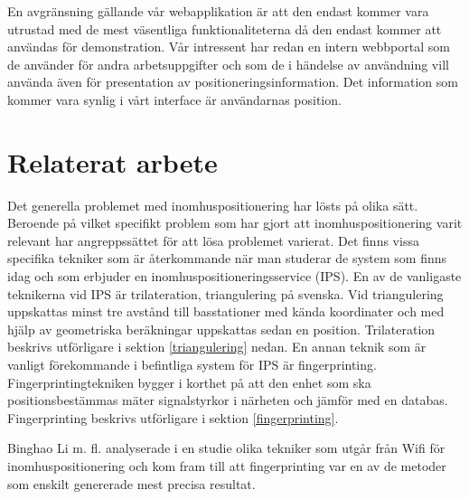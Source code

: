 \documentclass[swedish, a4paper,12pt]{article}
\begin{document}
En avgränsning gällande vår webapplikation är att den endast kommer vara utrustad med de mest väsentliga funktionaliteterna då den endast kommer att användas för demonstration. Vår intressent har redan en intern webbportal som de använder för andra arbetsuppgifter och som de i händelse av användning vill använda även för presentation av positioneringsinformation. Det information som kommer vara synlig i vårt interface är användarnas position.

\section{Relaterat arbete}
Det generella problemet med inomhuspositionering har lösts på olika sätt.
Beroende på vilket specifikt problem som har gjort att inomhuspositionering varit relevant har angreppssättet för att lösa problemet varierat. Det finns vissa specifika tekniker som är återkommande när man studerar de system som finns idag och som erbjuder en inomhuspositioneringsservice (IPS)\cite{IP1}.
En av de vanligaste teknikerna vid IPS är trilateration\cite{cook2005indoor}, triangulering på svenska. Vid triangulering uppskattas minst tre avstånd till basstationer med kända koordinater och med hjälp av geometriska beräkningar uppskattas sedan en position. Trilateration beskrivs utförligare i sektion \ref{triangulering}
 nedan. En annan teknik som är vanligt förekommande i befintliga system för IPS är fingerprinting\cite{IP1}\cite{jun2018low}. Fingerprintingtekniken bygger i korthet på att den enhet som ska positionsbestämmas mäter signalstyrkor i närheten och jämför med en databas. Fingerprinting beskrivs utförligare i sektion \ref{fingerprinting}.

Binghao Li m. fl. analyserade i en studie \cite{IP1} olika tekniker som utgår från Wifi för inomhuspositionering och kom fram till att fingerprinting var en av de metoder som enskilt genererade mest precisa resultat.
\end{document}
